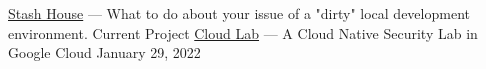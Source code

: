\vspace*{5pt}
\href{https://github.com/devsecfranklin/stash-house}{Stash House} --- What to do about your issue of a "dirty" local development environment.  \hfill Current Project
\vspace*{5pt}
\newline
\href{https://zenodo.org/records/5918861}{Cloud Lab} --- A Cloud Native Security Lab in Google Cloud   \hfill January 29, 2022
\vspace*{5pt}